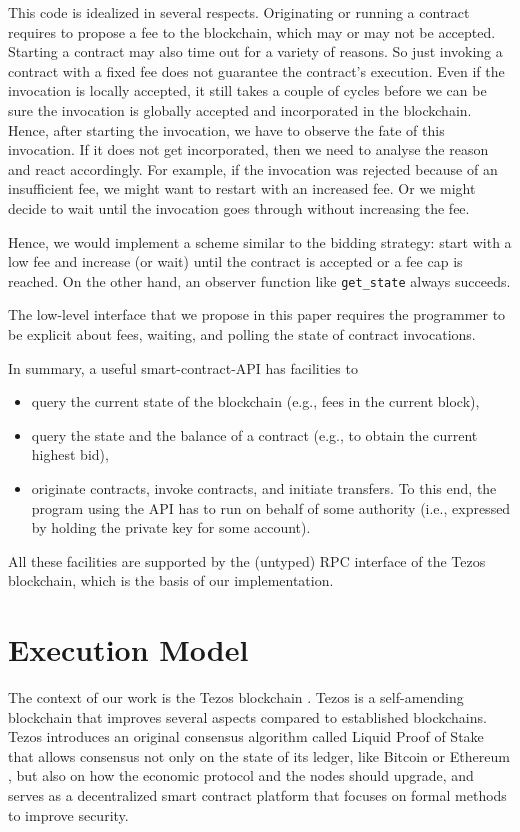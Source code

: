 \documentclass[a4paper]{llncs}
\begin{document}
This code is idealized in several respects. Originating or running a contract
requires to propose a fee to the blockchain, which may or may not be
accepted.
Starting a contract may also time out for a variety of reasons. So just
invoking a contract with a fixed fee does not guarantee the contract's
execution.  Even if the invocation is locally accepted, it still takes
a couple of cycles before we can be sure the invocation is globally
accepted and incorporated in the blockchain.
Hence, after starting the invocation, we have to observe the fate of
this invocation. If it does not get incorporated, then we need to
analyse the reason and react accordingly. For example, if the
invocation was rejected because of an insufficient fee, we might want
to restart with an increased fee. Or we might decide to wait until the
invocation goes through without increasing the fee.

Hence, we would implement a scheme similar to
the bidding strategy: start with a low fee and increase (or wait) until the
contract is accepted or a fee cap is reached. On the other hand, an
observer function like \lstinline/get_state/ always succeeds.

The low-level interface that we propose in this paper requires the
programmer to be explicit about fees, waiting, and polling the state
of contract invocations. 

In summary, a useful smart-contract-API  has facilities to
\begin{itemize}
\item query the current state of the blockchain (e.g., fees in the
  current block),
\item query the state and the balance of a contract (e.g., to obtain
  the current highest bid),
\item originate contracts, invoke contracts, and initiate
  transfers. To this end, the program using the API has to run on
  behalf of some authority (i.e., expressed by holding the private key
  for some account).
\end{itemize}
All these facilities are supported by the (untyped) RPC interface of the Tezos
blockchain, which is the basis of our implementation. 

\section{Execution Model}
\label{sec:execution-model}
The context of our work is the Tezos blockchain \cite{tezos-whitepaper, tezos-intropaper}. Tezos is a self-amending blockchain that improves several aspects compared to established 
blockchains. Tezos introduces an original consensus algorithm called Liquid Proof of Stake that allows consensus not only on the state of its ledger, like Bitcoin \cite{bitcoin-whitepaper} or Ethereum \cite{eth-whitepaper}, but also on how the economic protocol and the nodes should  upgrade, and serves as a decentralized smart contract platform that focuses on formal methods to improve security. 
\end{document}
